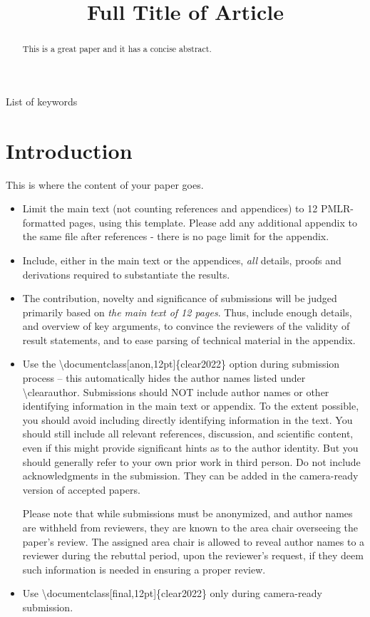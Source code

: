 \documentclass[anon,12pt]{clear2022} %
\title[Short Title]{Full Title of Article}
\begin{document}
\maketitle

\begin{abstract}%
  This is a great paper and it has a concise abstract.%
\end{abstract}

\begin{keywords}%
  List of keywords%
\end{keywords}

\section{Introduction}

This is where the content of your paper goes.
\begin{itemize}
  \item Limit the main text (not counting references and appendices) to 12 PMLR-formatted pages, using this template. Please add any additional appendix to the same file after references - there is no page limit for the appendix.
  \item Include, either in the main text or the appendices, \emph{all} details, proofs and derivations required to substantiate the results.
  \item The contribution, novelty and significance of submissions will be judged primarily based on
\textit{the main text of 12 pages}. Thus, include enough details, and overview of key arguments, 
to convince the reviewers of the validity of result statements, and to ease parsing of technical material in the appendix.
  \item Use the \textbackslash documentclass[anon,12pt]\{clear2022\} option during submission process -- this automatically hides the author names listed under \textbackslash clearauthor. Submissions should NOT include author names or other identifying information in the main text or appendix. To the extent possible, you should avoid including directly identifying information in the text. You should still include all relevant references, discussion, and scientific content, even if this might provide significant hints as to the author identity. But you should generally refer to your own prior work in third person. Do not include acknowledgments in the submission. They can be added in the camera-ready version of accepted papers.
  
  Please note that while submissions must be anonymized, and author names are withheld from reviewers, they are known to the area chair overseeing the paper’s review.  The assigned area chair is allowed to reveal author names to a reviewer during the rebuttal period, upon the reviewer’s request, if they deem such information is needed in ensuring a proper review.  
  \item Use \textbackslash documentclass[final,12pt]\{clear2022\} only during camera-ready submission.
\end{itemize}
\end{document}
